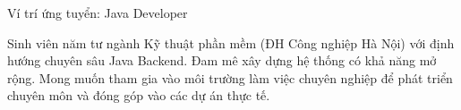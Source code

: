 \begin{cvempty} %
  \begin{cvitems} %
    \item {Ví trí ứng tuyển: Java Developer}
\item {Sinh viên năm tư ngành Kỹ thuật phần mềm (ĐH Công nghiệp Hà Nội) với định hướng chuyên sâu Java Backend. Đam mê xây dựng hệ thống có khả năng mở rộng. Mong muốn tham gia vào môi trường làm việc chuyên nghiệp để phát triển chuyên môn và đóng góp vào các dự án thực tế.}
  \end{cvitems}
\end{cvempty}
